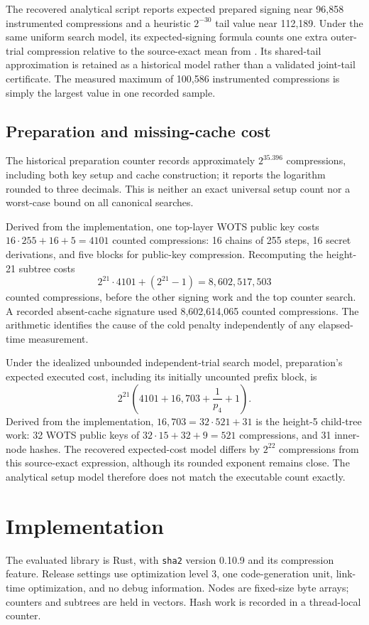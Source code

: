 \documentclass[a4paper,envcountsame,runningheads]{llncs}
\begin{document}
The recovered analytical script reports expected prepared signing near 96,858 instrumented compressions and a heuristic $2^{-30}$ tail value near 112,189. Under the same uniform search model, its expected-signing formula counts one extra outer-trial compression relative to the source-exact mean from . Its shared-tail approximation is retained as a historical model rather than a validated joint-tail certificate. The measured maximum of 100,586 instrumented compressions is simply the largest value in one recorded sample.

\subsection{Preparation and missing-cache cost}
The historical preparation counter records approximately $2^{35.396}$ compressions, including both key setup and cache construction; it reports the logarithm rounded to three decimals. This is neither an exact universal setup count nor a worst-case bound on all canonical searches.

Derived from the implementation, one top-layer WOTS public key costs $16\cdot255+16+5=4101$ counted compressions: 16 chains of 255 steps, 16 secret derivations, and five blocks for public-key compression. Recomputing the height-21 subtree costs
\[
 2^{21}\cdot4101+(2^{21}-1)=8{,}602{,}517{,}503
\]
counted compressions, before the other signing work and the top counter search. A recorded absent-cache signature used 8,602,614,065 counted compressions. The arithmetic identifies the cause of the cold penalty independently of any elapsed-time measurement.

Under the idealized unbounded independent-trial search model, preparation's expected executed cost, including its initially uncounted prefix block, is
\[
 2^{21}\left(4101+16{,}703+\frac{1}{p_4}+1\right).
\]
Derived from the implementation, $16{,}703=32\cdot521+31$ is the height-5 child-tree work: 32 WOTS public keys of $32\cdot15+32+9=521$ compressions, and 31 inner-node hashes. The recovered expected-cost model differs by $2^{22}$ compressions from this source-exact expression, although its rounded exponent remains close. The analytical setup model therefore does not match the executable count exactly.

\section{Implementation}\label{sec:implementation}
The evaluated library is Rust, with \texttt{sha2} version 0.10.9 and its compression feature. Release settings use optimization level 3, one code-generation unit, link-time optimization, and no debug information. Nodes are fixed-size byte arrays; counters and subtrees are held in vectors. Hash work is recorded in a thread-local counter.
\end{document}
